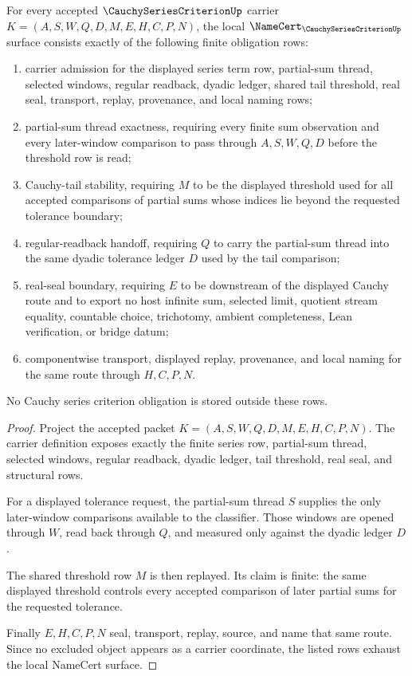 \begin{theorem}\label{thm:cauchy-series-criterion-namecert-obligations}
For every accepted $\CauchySeriesCriterionUp$ carrier $K=(A,S,W,Q,D,M,E,H,C,P,N)$, the local $\NameCert_{\CauchySeriesCriterionUp}$ surface consists exactly of the following finite obligation rows:
\begin{enumerate}
\item carrier admission for the displayed series term row, partial-sum thread, selected windows, regular readback, dyadic ledger, shared tail threshold, real seal, transport, replay, provenance, and local naming rows;
\item partial-sum thread exactness, requiring every finite sum observation and every later-window comparison to pass through $A,S,W,Q,D$ before the threshold row is read;
\item Cauchy-tail stability, requiring $M$ to be the displayed threshold used for all accepted comparisons of partial sums whose indices lie beyond the requested tolerance boundary;
\item regular-readback handoff, requiring $Q$ to carry the partial-sum thread into the same dyadic tolerance ledger $D$ used by the tail comparison;
\item real-seal boundary, requiring $E$ to be downstream of the displayed Cauchy route and to export no host infinite sum, selected limit, quotient stream equality, countable choice, trichotomy, ambient completeness, Lean verification, or bridge datum;
\item componentwise transport, displayed replay, provenance, and local naming for the same route through $H,C,P,N$.
\end{enumerate}
No Cauchy series criterion obligation is stored outside these rows.
\end{theorem}
\begin{proof}
Project the accepted packet $K=(A,S,W,Q,D,M,E,H,C,P,N)$. The carrier definition exposes exactly the finite series row, partial-sum thread, selected windows, regular readback, dyadic ledger, tail threshold, real seal, and structural rows.

For a displayed tolerance request, the partial-sum thread $S$ supplies the only later-window comparisons available to the classifier. Those windows are opened through $W$, read back through $Q$, and measured only against the dyadic ledger $D$.

The shared threshold row $M$ is then replayed. Its claim is finite: the same displayed threshold controls every accepted comparison of later partial sums for the requested tolerance.

Finally $E,H,C,P,N$ seal, transport, replay, source, and name that same route. Since no excluded object appears as a carrier coordinate, the listed rows exhaust the local NameCert surface.
\end{proof}


